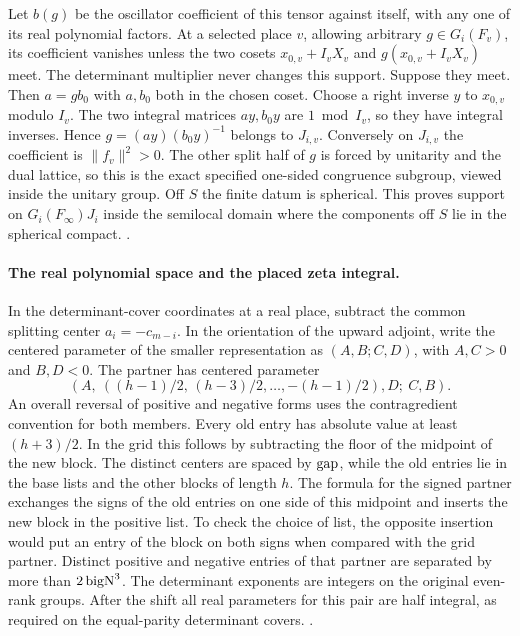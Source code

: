 Let \(b(g)\) be the oscillator coefficient of this tensor against
itself, with any one of its real polynomial factors. At a selected
place \(v\), allowing arbitrary \(g\in G_i(F_v)\), its coefficient
vanishes unless the two cosets
\(x_{0,v}+I_vX_v\) and \(g(x_{0,v}+I_vX_v)\) meet. The
determinant multiplier never changes this support. Suppose they meet.
Then \(a=g b_0\) with \(a,b_0\) both in the chosen coset. Choose a
right inverse \(y\) to \(x_{0,v}\) modulo \(I_v\). The two integral
matrices \(a y, b_0 y\) are \(1\bmod I_v\), so they have integral
inverses. Hence \(g=(a y)(b_0 y)^{-1}\) belongs to \(J_{i,v}\).
Conversely on \(J_{i,v}\) the coefficient is
\(\|f_v\|^2>0\). The other split half of \(g\) is forced by
unitarity and the dual lattice, so this is the exact specified
one-sided congruence subgroup, viewed inside the unitary group.
Off \(S\) the finite datum is spherical. This proves support
on \(G_i(F_\infty)J_i\) inside the semilocal domain
where the components off \(S\) lie in the spherical compact.
.

\paragraph{The real polynomial space and the placed zeta integral.}
In the determinant-cover coordinates at a real place, subtract the
common splitting center \(a_i=-c_{m-i}\). In the orientation of the
upward adjoint, write the centered parameter of the smaller
representation as \((A,B;C,D)\), with \(A,C>0\) and \(B,D<0\).
The partner has centered parameter
\[
 (A,\ ((h-1)/2,\,(h-3)/2,\ldots,-(h-1)/2),D;\ C,B).
\]
An overall reversal of positive and negative forms uses the
contragredient convention for both members. Every old entry has
absolute value at least \((h+3)/2\). In the grid this follows by
subtracting the floor of the midpoint of the new block. The distinct
centers are spaced by \({\rm gap}\), while the old entries lie in the
base lists and the other blocks of length \(h\). The formula
for the signed partner exchanges the signs of the old entries on
one side of this midpoint and inserts the new block in the positive
list. To check the choice of list, the opposite insertion would put
an entry of the block on both signs when compared with the grid
partner. Distinct positive and negative entries of that partner
are separated by more than \(2\,{\rm bigN}^3\).
The determinant exponents are integers on the original even-rank
groups. After the shift all real parameters for this pair are
half integral, as required on the equal-parity determinant covers.
.

